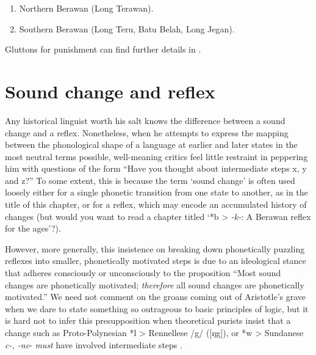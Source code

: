 \documentclass[output=paper]{langscibook}
\begin{document}
\begin{enumerate}
\item Northern Berawan (Long Terawan).
\item Southern Berawan (Long Teru, Batu Belah, Long Jegan).
\end{enumerate}

Gluttons for punishment can find further details in \citet{Blust2010}.

\section{Sound change and reflex}\label{sec:Sound-change-reflex}
Any historical linguist worth his salt knows the difference between a sound change and a reflex.  Nonetheless, when he attempts to express the mapping between the phonological shape of a language at earlier and later states in the most neutral terms possible, well-meaning critics feel little restraint in peppering him with questions of the form “Have you thought about intermediate steps x, y and z?” To some extent, this is because the term ‘sound change’ is often used loosely either for a single phonetic transition from one state to another, as in the title of this chapter, or for a reflex, which may encode an accumulated history of changes (but would you want to read a chapter titled ‘*b > \textit{-k-}: A Berawan reflex for the ages’?).

However, more generally, this insistence on breaking down phonetically puzz\-ling reflexes into
smaller, phonetically motivated steps is due to an ideological stance that adheres consciously or unconsciously to the proposition “Most sound changes are phonetically motivated; \textit{therefore} all sound changes are phonetically motivated.” We need not comment on the groans coming out of Aristotle’s grave when we dare to state something so outrageous to basic principles of logic, but it is hard not to infer this presupposition when theoretical purists insist that a change such as Proto-Polynesian *l > Rennellese /g/ ([ŋg]), or *w > Sundanese \textit{c-, -nc}- \textit{must} have involved intermediate steps \citep{Blust2005}.
\end{document}
